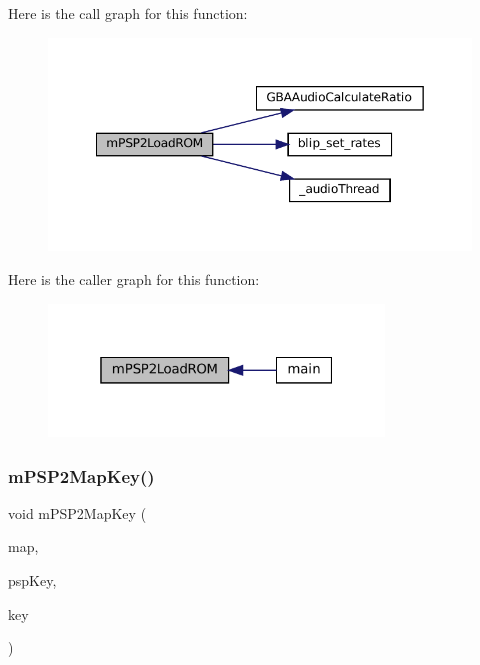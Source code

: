 Here is the call graph for this function\+:
\nopagebreak
\begin{figure}[H]
\begin{center}
\leavevmode
\includegraphics[width=349pt]{psp2-context_8c_a6d1428d32dd856760fa94b6a08e54ab2_cgraph}
\end{center}
\end{figure}
Here is the caller graph for this function\+:
\nopagebreak
\begin{figure}[H]
\begin{center}
\leavevmode
\includegraphics[width=253pt]{psp2-context_8c_a6d1428d32dd856760fa94b6a08e54ab2_icgraph}
\end{center}
\end{figure}
\mbox{\label{psp2-context_8c_a0ff9569feeb9a2f318792b681331c9ab}} 
\subsubsection{\texorpdfstring{m\+P\+S\+P2\+Map\+Key()}{mPSP2MapKey()}}
{\footnotesize\ttfamily void m\+P\+S\+P2\+Map\+Key (\begin{DoxyParamCaption}\item[{struct m\+Input\+Map $\ast$}]{map,  }\item[{\mbox{\hyperlink{ioapi_8h_a787fa3cf048117ba7123753c1e74fcd6}{int}}}]{psp\+Key,  }\item[{\mbox{\hyperlink{ioapi_8h_a787fa3cf048117ba7123753c1e74fcd6}{int}}}]{key }\end{DoxyParamCaption})}

